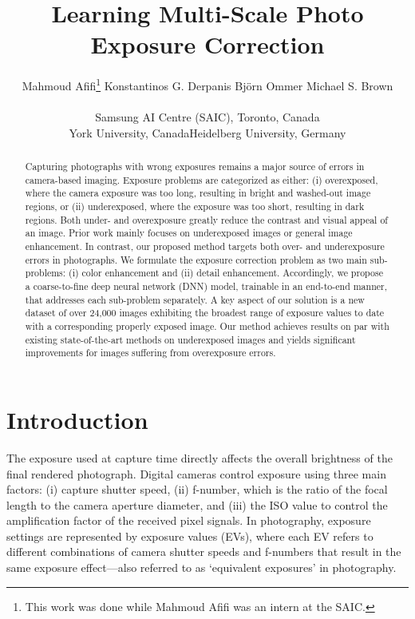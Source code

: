 \documentclass[final]{cvpr}
\begin{document}
\title{Learning Multi-Scale Photo Exposure Correction}

\author{Mahmoud Afifi\thanks{This work was done while Mahmoud Afifi was an intern at the SAIC.} \hspace{5mm} Konstantinos G. Derpanis \hspace{5mm} Bj{\"o}rn Ommer \hspace{5mm} Michael S. Brown\\\\
Samsung AI Centre (SAIC), Toronto, Canada\\York University, Canada\hspace{0.4cm}Heidelberg University, Germany}



\maketitle


\begin{abstract}
Capturing photographs with wrong exposures remains a major source of errors in camera-based imaging. Exposure problems are categorized as either: (i) overexposed, where the camera exposure was too long, resulting in bright and washed-out image regions, or (ii) underexposed, where the exposure was too short, resulting in dark regions. Both under- and overexposure greatly reduce the contrast and visual appeal of an image. Prior work mainly focuses on underexposed images or general image enhancement. In contrast, our proposed method targets both over- and underexposure errors in photographs. We formulate the exposure correction problem as two main sub-problems: (i) color enhancement and (ii) detail enhancement. Accordingly, we propose a coarse-to-fine deep neural network (DNN) model, trainable in an end-to-end manner, that addresses each sub-problem separately. A key aspect of our solution is a new dataset of over 24,000 images exhibiting the broadest range of exposure values to date with a corresponding properly exposed image. Our method achieves results on par with existing state-of-the-art methods on underexposed images and yields significant improvements for images suffering from overexposure errors.
\end{abstract}

\section{Introduction}
\label{sec:intro}

The exposure used at capture time directly affects the overall brightness of the final rendered photograph. Digital cameras control exposure using three main factors: (i) capture shutter speed, (ii) f-number, which is the ratio of the focal length to the camera aperture diameter, and (iii) the ISO value to control the amplification factor of the received pixel signals. In photography, exposure settings are represented by exposure values (EVs), where each EV refers to different combinations of camera shutter speeds and f-numbers that result in the same exposure effect---also referred to as `equivalent exposures' in photography.
\end{document}
